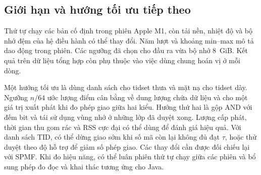 \subsection{Giới hạn và hướng tối ưu tiếp theo}
Thứ tự chạy các bản cố định trong phiên Apple M1, còn tải nền,
nhiệt độ và bộ nhớ đệm của hệ điều hành có thể thay đổi. Năm
lượt và khoảng min--max mô tả dao động trong phiên. Các ngưỡng
đã chọn cho đầu ra vừa bộ nhớ 8~GiB. Kết quả trên dữ liệu tổng
hợp còn phụ thuộc vào việc dùng chung hoán vị ở mỗi dòng.

Một hướng tối ưu là dùng danh sách cho tidset thưa và mặt nạ
cho tidset dày. Ngưỡng $n/64$ ước lượng điểm cân bằng về dung
lượng chứa dữ liệu và cho một giá trị xuất phát khi đo phép giao
giữa hai kiểu. Hướng thứ hai là gộp AND với đếm bit và tái sử
dụng vùng nhớ ở những lớp đã duyệt xong. Lượng cấp phát, thời
gian thu gom rác và RSS cực đại có thể dùng để đánh giá hiệu quả.
Với danh sách TID, có thể dừng giao sớm khi số mã còn lại
không đủ đạt $\tau$, hoặc thử duyệt theo độ hỗ trợ để giảm số
phép giao. Các thay đổi cần được đối chiếu lại với SPMF. Khi
đo hiệu năng, có thể luân phiên thứ tự chạy giữa các phiên và
bổ sung phép đo đọc và khai thác tương ứng cho Java.
